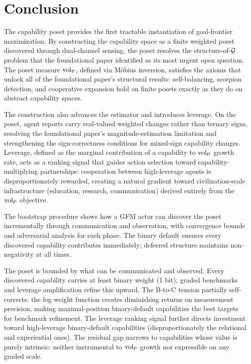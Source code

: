 \section{Conclusion}
\label{sec:conclusion}

The capability poset provides the first tractable instantiation of
goal-frontier maximization. By constructing the capability space as a finite
weighted poset discovered through dual-channel sensing, the poset resolves
the structure-of-$\mathcal{G}$ problem that the foundational paper identified as its
most urgent open question. The poset measure ${\operatorname{vol}_{\mathrm{P}}}$, defined via M\"{o}bius
inversion, satisfies the axioms that unlock all of the foundational paper's
structural results: self-balancing, scorpion detection, and cooperative
expansion hold on finite posets exactly as they do on abstract capability
spaces.

The construction also advances the estimator and introduces leverage. On the
poset, agent reports carry real-valued weighted changes rather than ternary
signs, resolving the foundational paper's magnitude-estimation limitation and
strengthening the sign-correctness conditions for mixed-sign capability
changes. Leverage, defined as the marginal contribution of a capability to
${\operatorname{vol}_{\mathrm{P}}}$ growth rate, acts as a ranking signal that guides action selection
toward capability-multiplying partnerships: cooperation between high-leverage
agents is disproportionately rewarded, creating a natural gradient toward
civilization-scale infrastructure (education, research, communication)
derived entirely from the ${\operatorname{vol}_{\mathrm{P}}}$ objective.

The bootstrap procedure shows how a GFM actor can discover the poset
incrementally through communication and observation, with convergence bounds
and adversarial analysis for each phase. The binary default ensures every
discovered capability contributes immediately; deferred structure maintains
non-negativity at all times.

The poset is bounded by what can be communicated and observed. Every
discovered capability carries at least binary weight (1 bit); graded benchmarks
and leverage amplification refine this upward. The B-to-C tension partially self-corrects: the log weight function creates
diminishing returns on measurement precision, making maximal-position
binary-default capabilities the best targets for benchmark refinement. The
leverage ranking signal further directs investment toward high-leverage
binary-default capabilities (disproportionately the relational and
experiential ones). The residual gap narrows to capabilities whose value is
purely intrinsic: neither instrumental to ${\operatorname{vol}_{\mathrm{P}}}$ growth nor expressible on any
graded scale.
